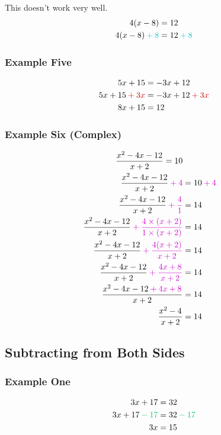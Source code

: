 \documentclass[a4paper,12pt]{article}
\begin{document}
This doesn't work very well.
\begin{align*}
4(x - 8)  &=  12 \\
4(x - 8) \color{Turquoise3}+ 8\color{black}  &=  12 \color{Turquoise3}+ 8\color{black} \\
\end{align*}

\subsubsection*{Example Five}

\begin{align*}
5x + 15 &= -3x + 12 \\
5x + 15 \color{Red3} + 3x\color{black} &= -3x + 12 \color{Red3} + 3x\color{black} \\
8x + 15 &= 12
\end{align*}

\subsubsection*{Example Six (Complex)}

\begin{align*}
\frac{x^2 - 4x - 12}{x + 2} = 10 \\
\frac{x^2 - 4x - 12}{x + 2}\color{Magenta3} + 4\color{black} &= 10 \color{Magenta3} + 4 \color{black} \\
\frac{x^2 - 4x - 12}{x + 2}\color{Magenta3} + \frac{4}{1}\color{black} &= 14 \\
\frac{x^2 - 4x - 12}{x + 2}\color{Magenta3} + \frac{4\times(x + 2)}{1\times(x + 2)}\color{black} &= 14 \\
\frac{x^2 - 4x - 12}{x + 2}\color{Magenta3} + \frac{4(x + 2)}{x + 2}\color{black} &= 14 \\
\frac{x^2 - 4x - 12}{x + 2}\color{Magenta3} + \frac{4x + 8}{x + 2}\color{black} &= 14 \\
\frac{x^2 - 4x - 12 \color{Magenta3} + 4x + 8}{x + 2} &= 14 \\
\frac{x^2 - 4}{x+2} &= 14
\end{align*}

\subsection*{Subtracting from Both Sides}

\subsubsection*{Example One}

\begin{align*}
3x + 17 &= 32 \\
3x + 17 \color{SpringGreen3} - 17\color{black} &= 32 \color{SpringGreen3} - 17\color{black} \\
3x &= 15 \\
\end{align*}
\end{document}
